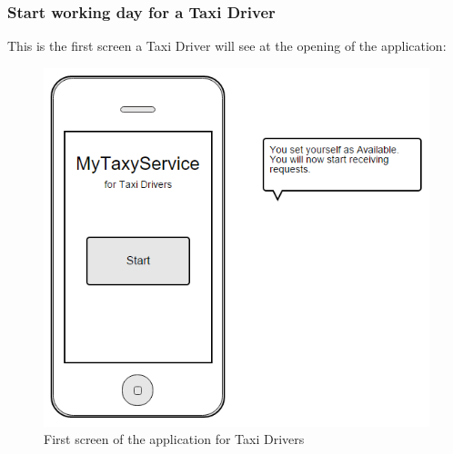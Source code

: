 \subsubsection{Start working day for a Taxi Driver}
This is the first screen a Taxi Driver will see at the opening of the application:
\begin{figure}[H]
\centering
\includegraphics[scale=0.6]{Images/start_taxi_driver}
\caption{First screen of the application for Taxi Drivers}
\end{figure}

